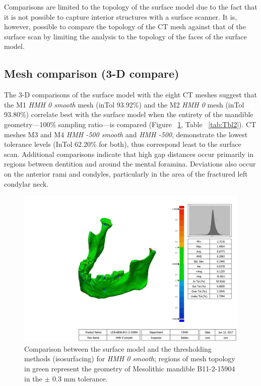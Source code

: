 \documentclass[review]{elsarticle}
\begin{document}
Comparisons are limited to the topology of the surface model due to the fact that it is not possible to capture interior structures with a surface scanner. It is, however, possible to compare the topology of the CT mesh against that of the surface scan by limiting the analysis to the topology of the faces of the surface model. 

\subsection*{Mesh comparison (3-D compare)}

The 3-D comparisons of the surface model with the eight CT meshes suggest that the M1 \textit{HMH 0 smooth} mesh (inTol 93.92\%) and the M2 \textit{HMH 0} mesh (inTol 93.80\%) correlate best with the surface model when the entirety of the mandible geometry---100\% sampling ratio---is compared (Figure ~\ref{fig:Fig3}, Table ~\ref{tab:Tbl2}). CT meshes M3 and M4 \textit{HMH -500 smooth} and \textit{HMH -500}, demonstrate the lowest tolerance levels (InTol 62.20\% for both), thus correspond least to the surface scan. Additional comparisons indicate that high gap distances occur primarily in regions between dentition and around the mental foramina. Deviations also occur on the anterior rami and condyles, particularly in the area of the fractured left condylar neck. 

\begin{figure}[ht]\centering
\includegraphics[width=\linewidth]{Fig3}
\caption{Comparison between the surface model and the thresholding methods (isosurfacing) for \textit{HMH 0 smooth}; regions of mesh topology in green represent the geometry of Mesolithic mandible B11-2-15904 in the $\pm$ 0.3 mm tolerance.}
\label{fig:Fig3}
\end{figure}
\end{document}
